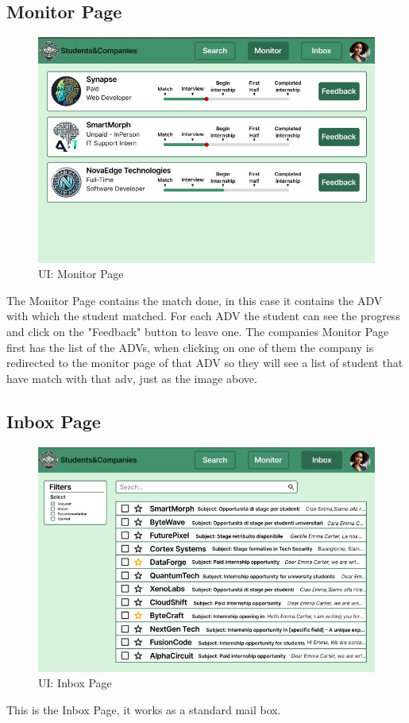 \subsection{Monitor Page}
\begin{figure}[H]
    \centering
    \includegraphics[width=15cm]{images/ui/monitor.jpg}
    \caption{UI: Monitor Page}
\end{figure}
The Monitor Page contains the match done, in this case it contains the ADV with which the student matched. For each ADV the student can see the progress and click on the "Feedback" button to leave one.
The companies Monitor Page first has the list of the ADVs, when clicking on one of them the company is redirected to the monitor page of that ADV so they will see a list of student that have match with that adv, just as the image above.

\subsection{Inbox Page}
\begin{figure}[H]
    \centering
    \includegraphics[width=15cm]{images/ui/inbox.jpg}
    \caption{UI: Inbox Page}
\end{figure}
This is the Inbox Page, it works as a standard mail box. 